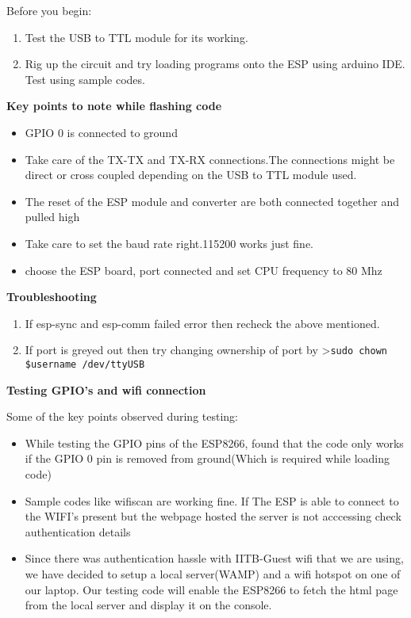 \documentclass[16pt]{article}
\begin{document}
Before you begin:

\begin{enumerate}

\item
  Test the USB to TTL module for its working.
\item
  Rig up the circuit and try loading programs onto the ESP using arduino
  IDE. Test using sample codes.
\end{enumerate}

\textbf{Key points to note while flashing code}

\begin{itemize}

\item
  GPIO 0 is connected to ground
\item
  Take care of the TX-TX and TX-RX connections.The connections might be
  direct or cross coupled depending on the USB to TTL module used.
\item
  The reset of the ESP module and converter are both connected together
  and pulled high
\item
  Take care to set the baud rate right.115200 works just fine.
\item
  choose the ESP board, port connected and set CPU frequency to 80 Mhz
\end{itemize}

\textbf{Troubleshooting}

\begin{enumerate}

\item
  If esp-sync and esp-comm failed error then recheck the above
  mentioned.
\item
  If port is greyed out then try changing ownership of port by
  \textgreater{}\texttt{sudo chown \$username /dev/ttyUSB}
\end{enumerate}

\textbf{Testing GPIO's and wifi connection}

Some of the key points observed during testing:

\begin{itemize}

\item
  While testing the GPIO pins of the ESP8266, found that the code only
  works if the GPIO 0 pin is removed from ground(Which is required while
  loading code)
\item
  Sample codes like wifiscan are working fine. If The ESP is able to
  connect to the WIFI's present but the webpage hosted the server is not
  acccessing check authentication details
\item
  Since there was authentication hassle with IITB-Guest wifi that we are
  using, we have decided to setup a local server(WAMP) and a wifi
  hotspot on one of our laptop. Our testing code will enable the ESP8266
  to fetch the html page from the local server and display it on the
  console.
  
\end{itemize}
\end{document}
